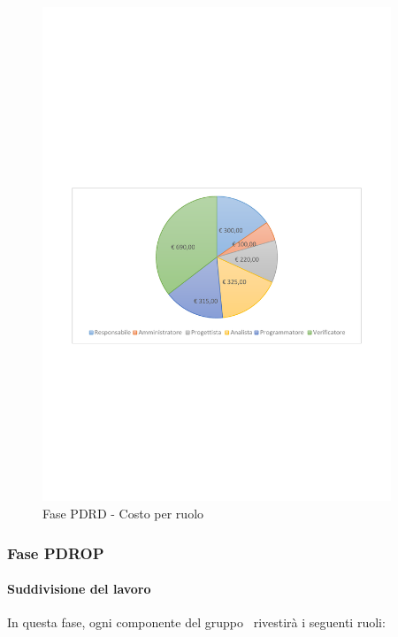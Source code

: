 \documentclass[../PianoProgetto.tex]{subfiles}
\begin{document}
\vfill	
\newpage
\vfill
	\begin{figure}[!h]
		\centering
		\includegraphics[width=0.93\textwidth , trim=2cm 9.5cm 2cm 11cm]{grafici/PDRD/PDRD-costo}
			\caption{Fase PDRD - Costo per ruolo}
		\label{fig:CircleChart-fasePDRD_costo_r}
	\end{figure}
\vfill
	
	\subsubsection{Fase PDROP}
				\paragraph{Suddivisione del lavoro}
					In questa fase\g, ogni componente del gruppo \leaf\ rivestirà i seguenti ruoli:
	
\end{document}
